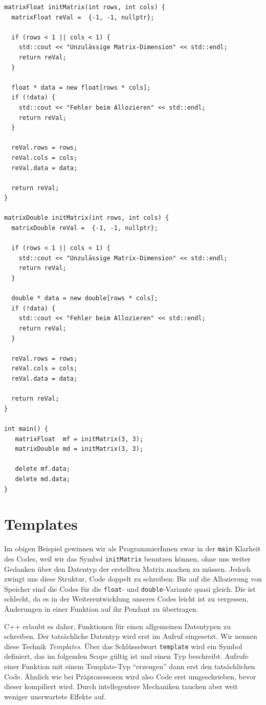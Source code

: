 \begin{codebox}[]
\begin{verbatim}
matrixFloat initMatrix(int rows, int cols) {
  matrixFloat reVal =  {-1, -1, nullptr};
  
  if (rows < 1 || cols < 1) {
    std::cout << "Unzulässige Matrix-Dimension" << std::endl;
    return reVal;
  }
  
  float * data = new float[rows * cols];
  if (!data) {
    std::cout << "Fehler beim Allozieren" << std::endl;
    return reVal;
  }
  
  reVal.rows = rows;
  reVal.cols = cols;
  reVal.data = data;
  
  return reVal;
}

matrixDouble initMatrix(int rows, int cols) {
  matrixDouble reVal =  {-1, -1, nullptr};
  
  if (rows < 1 || cols < 1) {
    std::cout << "Unzulässige Matrix-Dimension" << std::endl;
    return reVal;
  }
  
  double * data = new double[rows * cols];
  if (!data) {
    std::cout << "Fehler beim Allozieren" << std::endl;
    return reVal;
  }
  
  reVal.rows = rows;
  reVal.cols = cols;
  reVal.data = data;
  
  return reVal;
}

int main() {
   matrixFloat  mf = initMatrix(3, 3);
   matrixDouble md = initMatrix(3, 3);
   
   delete mf.data;
   delete md.data;
}
\end{verbatim}
\end{codebox}


\section{Templates}
Im obigen Beispiel gewinnen wir als ProgrammierInnen zwar in der \texttt{main} Klarheit des Codes, weil wir das Symbol \texttt{initMatrix} benutzen können, ohne uns weiter Gedanken über den Datentyp der erstellten Matrix machen zu müssen. Jedoch zwingt uns diese Struktur, Code doppelt zu schreiben: Bis auf die Allozierung von Speicher sind die Codes für die \texttt{float}- und 
\texttt{double}-Variante quasi gleich. Die ist schlecht, da es in der Weiterentwicklung unseres Codes leicht ist zu vergessen, Änderungen in einer Funktion auf ihr Pendant zu übertragen.

C++ erlaubt es daher, Funktionen für einen allgemeinen Datentypen zu schreiben. Der tatsächliche Datentyp wird erst im Aufruf eingesetzt. Wir nennen diese Technik \emph{Templates}. Über das Schlüsselwort \texttt{template} wird ein Symbol definiert, das im folgenden Scope gültig ist und einen Typ beschreibt. Aufrufe einer Funktion mit einem Template-Typ \enquote{erzeugen} dann erst den tatsächlichen Code. Ähnlich wie bei Präprozessoren wird also Code erst umgeschrieben, bevor dieser kompiliert wird. Durch intellegentere Mechaniken tauchen aber weit weniger unerwartete Effekte auf.


